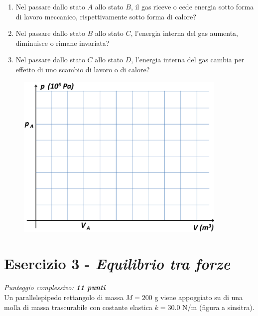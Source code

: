 \documentclass{article}
\begin{document}
\begin{enumerate}[label=\textbf{\roman*)}, leftmargin=1.5cm]
    \item Nel passare dallo stato $A$ allo stato $B$, il gas riceve o cede
        energia sotto forma di lavoro meccanico, rispettivamente sotto
        forma di calore?
    \item Nel passare dallo stato $B$ allo stato $C$, l'energia interna del gas
        aumenta, diminuisce o rimane invariata?
    \item Nel passare dallo stato $C$ allo stato $D$, l'energia interna del gas
        cambia per effetto di uno scambio di lavoro o di calore?
\end{enumerate}
\pagebreak

\begin{figure}[h]
    \begin{center}
        \vspace{4cm}
        {\includegraphics[width=0.9\textwidth]{Esercizio 2.png}}
    \end{center}
\end{figure}
\pagebreak

\section*{Esercizio 3 - \textit{Equilibrio tra forze}}
\vspace{-3mm} {\textit{Punteggio complessivo: \textbf{11 punti}}} \vspace{5mm} \\
Un parallelepipedo rettangolo di massa $M = 200$ g viene appoggiato su di una
molla di massa trascurabile con costante elastica $k = 30.0$ N/m (figura a sinsitra).
\end{document}
